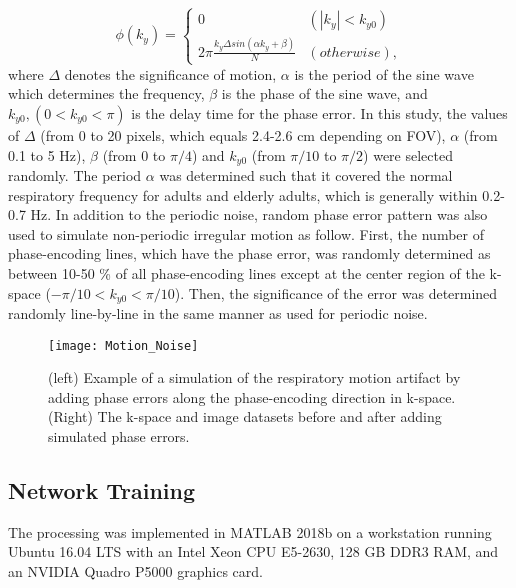 \documentclass[num-refs]{wiley-article}
\begin{document}
\[
  \phi(k_y) = \left\{ \begin{array}{ll}
    0 & (|k_y| < k_{y0} ) \\
    2\pi \frac{k_y \Delta sin(\alpha k_y + \beta)}{N} & (otherwise),
  \end{array} \right.
\]
where $\Delta$ denotes the significance of motion, $\alpha$ is the period of the sine wave which determines the frequency, $\beta$ is the phase of the sine wave, and $k_{y0}, (0 < k_{y0} < \pi)$ is the delay time for the phase error. In this study, the values of $\Delta$ (from 0 to 20 pixels, which equals 2.4-2.6 cm depending on FOV), $\alpha$ (from 0.1 to 5 Hz), $\beta$ (from 0 to $\pi /4$) and $k_{y0}$ (from $\pi/10$ to $\pi/2$) were selected randomly. The period $\alpha$ was determined such that it covered the normal respiratory frequency for adults and elderly adults, which is generally within 0.2-0.7 Hz\cite{rodriguez2013normal}. In addition to the periodic noise, random phase error pattern was also used to simulate non-periodic irregular motion as follow. First, the number of phase-encoding lines, which have the phase error, was randomly determined as between 10-50 \% of all phase-encoding lines except at the center region of the k-space ($-\pi /10 < k_{y0} < \pi /10$). Then, the significance of the error was determined randomly line-by-line in the same manner as used for periodic noise.

\begin{figure}[bt]
\centering
\texttt{[image: Motion\_Noise]}
\caption{(left) Example of a simulation of the respiratory motion artifact by adding phase errors along the phase-encoding direction in k-space. (Right) The k-space and image datasets before and after adding simulated phase errors.}
\label{fig_motion}
\end{figure}


\subsection{Network Training}

The processing was implemented in MATLAB 2018b on a workstation running Ubuntu 16.04 LTS with an Intel Xeon CPU E5-2630, 128 GB DDR3 RAM, and an NVIDIA Quadro P5000 graphics card.
\end{document}
